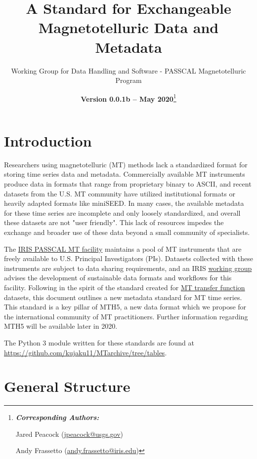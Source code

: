 \documentclass{article}
\title{A Standard for Exchangeable Magnetotelluric Data and Metadata}
\date{\textbf{Version 0.0.1b -- May 2020}\footnote{\noindent\textbf{\textit{Corresponding Authors:}}
		
		Jared Peacock (\url{jpeacock@usgs.gov})
		
		Andy Frassetto (\url{andy.frassetto@iris.edu})}}
\author[1]{Working Group for Data Handling and Software - PASSCAL Magnetotelluric Program}
\affil[1]{Portable Array Seismic Studies of the Continental Lithosphere, Incorporated Research Institutions for Seismology}
\begin{document}
	
\maketitle

\tableofcontents
\vspace{1cm}



%
%
\newpage

\section{Introduction}

Researchers using magnetotelluric (MT) methods lack a standardized format for storing time series data and metadata. Commercially available MT instruments produce data in formats that range from proprietary binary to ASCII, and recent datasets from the U.S. MT community have utilized institutional formats or heavily adapted formats like miniSEED. In many cases, the available metadata for these time series are incomplete and only loosely standardized, and overall these datasets are not "user friendly". This lack of resources impedes the exchange and broader use of these data beyond a small community of specialists.

The \href{https://www.iris.edu/hq/programs/passcal/magnetotelluricnstrumentation}{IRIS PASSCAL MT facility} maintains a pool of MT instruments that are freely available to U.S. Principal Investigators (PIs). Datasets collected with these instruments are subject to data sharing requirements, and an IRIS \href{https://www.iris.edu/hq/aboutris/governance/mtoft}{working group} advises the development of sustainable data formats and workflows for this facility. Following in the spirit of the standard created for \href{https://library.seg.org/doi/10.1190/geo2018-0679.1}{MT transfer function} datasets, this document outlines a new metadata standard for MT time series. This standard is a key pillar of MTH5, a new data format which we propose for the international community of MT practitioners. Further information regarding MTH5 will be available later in 2020.

The Python 3 module written for these standards are found at \url{https://github.com/kujaku11/MTarchive/tree/tables}.

\section{General Structure}
\end{document}
